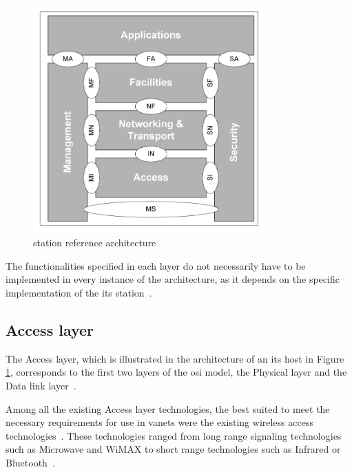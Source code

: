\begin{figure}[htbp]
    \centering
   	\includegraphics[width=0.8\textwidth]{Chapters/Figures/VANETs/ITS-S_host_arch.png}
    \caption{ station reference architecture~\cite{etsi_intelligent_2010}}
   	\label{fig:its_host}
\end{figure}

The functionalities specified in each layer do not necessarily have to be implemented in every instance of the architecture, as it depends on the specific implementation of the \gls{its} station~\cite{etsi_intelligent_2010}.

\subsection[Access layer]{Access layer}
\label{subsec:Access_layer}

The Access layer, which is illustrated in the architecture of an \gls{its} host in Figure \ref{fig:its_host}, corresponds to the first two layers of the \gls{osi} model, the Physical layer and the Data link layer~\cite{etsi_intelligent_2020}.

Among all the existing Access layer technologies, the best suited to meet the necessary requirements for use in \glspl{vanet} were the existing wireless access technologies~\cite{al-sultan_comprehensive_2014}. These technologies ranged from long range signaling technologies such as Microwave and WiMAX to short range technologies such as Infrared or Bluetooth~\cite{anwer_survey_2014}.

